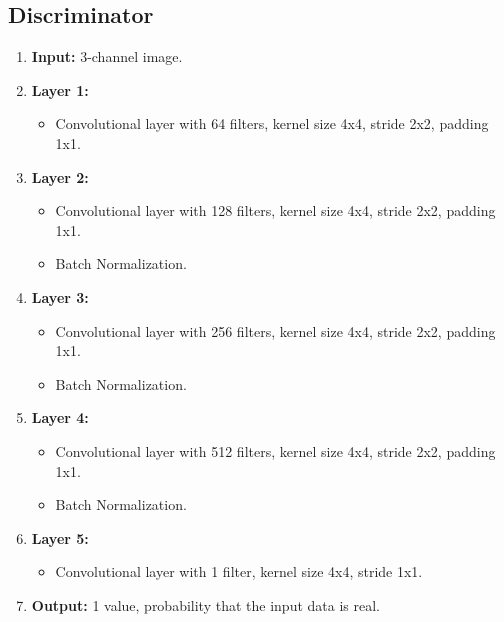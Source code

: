 \subsection*{Discriminator}
\begin{enumerate}
    \item \textbf{Input:} 3-channel image.
    \item \textbf{Layer 1:} 
    \begin{itemize}
        \item Convolutional layer with 64 filters, kernel size 4x4, stride 2x2, padding 1x1.
    \end{itemize}
    \item \textbf{Layer 2:} 
    \begin{itemize}
        \item Convolutional layer with 128 filters, kernel size 4x4, stride 2x2, padding 1x1.
        \item Batch Normalization.
    \end{itemize}
    \item \textbf{Layer 3:} 
    \begin{itemize}
        \item Convolutional layer with 256 filters, kernel size 4x4, stride 2x2, padding 1x1.
        \item Batch Normalization.
    \end{itemize}
    \item \textbf{Layer 4:} 
    \begin{itemize}
        \item Convolutional layer with 512 filters, kernel size 4x4, stride 2x2, padding 1x1.
        \item Batch Normalization.
    \end{itemize}
    \item \textbf{Layer 5:} 
    \begin{itemize}
        \item Convolutional layer with 1 filter, kernel size 4x4, stride 1x1.
    \end{itemize}
    \item \textbf{Output:} 1 value, probability that the input data is real.
\end{enumerate}

